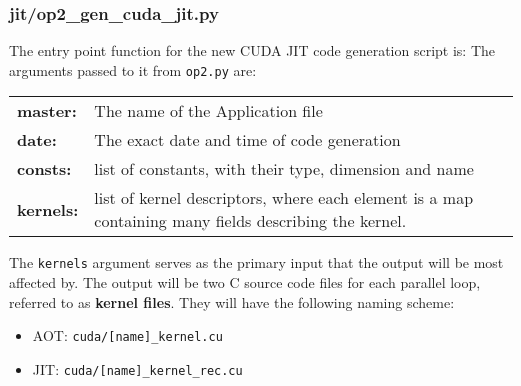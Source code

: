 \subsubsection{jit/op2\_gen\_cuda\_jit.py}
The entry point function for the new CUDA JIT code generation script is:
\noindent The arguments passed to it from \verb|op2.py| are:
\begin{center}
\begin{tabular}{>{\bfseries}l l}
master: & The name of the Application file \\[\medskipamount]
date: & The exact date and time of code generation \\[\medskipamount]
consts: & list of constants, with their type, dimension and name \\[\medskipamount]
kernels: & \parbox[t]{.8\textwidth}{list of kernel descriptors, where each element is a map containing many fields describing the kernel.} \\[\medskipamount]
\end{tabular}
\end{center}
\vspace{1em}
\noindent The \verb|kernels| argument serves as the primary input that the output will be most affected by. The output will be two C source code files for each parallel loop, referred to as \textbf{kernel files}. They will have the following naming scheme:
\begin{itemize}
\vspace{-.5em}
\item{AOT: \verb|cuda/[name]_kernel.cu|}
\vspace{-.5em}
\item{JIT: \verb|cuda/[name]_kernel_rec.cu|}
\end{itemize}

